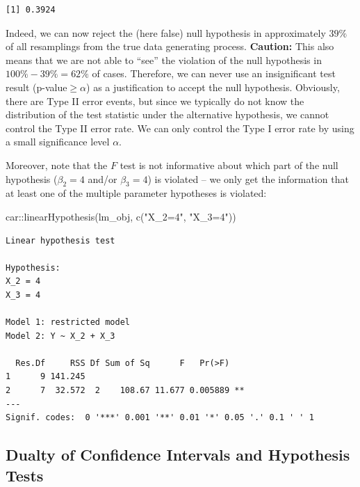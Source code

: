 \documentclass[
  letterpaper,
  DIV=11,
  numbers=noendperiod]{scrreprt}
\newenvironment{Shaded}{\begin{snugshade}}{\end{snugshade}}
\newcommand{\FunctionTok}[1]{\textcolor[rgb]{0.28,0.35,0.67}{#1}}
\newcommand{\NormalTok}[1]{\textcolor[rgb]{0.00,0.23,0.31}{#1}}
\newcommand{\SpecialCharTok}[1]{\textcolor[rgb]{0.37,0.37,0.37}{#1}}
\newcommand{\StringTok}[1]{\textcolor[rgb]{0.13,0.47,0.30}{#1}}
\theoremstyle{definition}
\theoremstyle{plain}
\theoremstyle{plain}
\theoremstyle{remark}
\begin{document}
\begin{verbatim}
[1] 0.3924
\end{verbatim}

Indeed, we can now reject the (here false) null hypothesis in
approximately \(39\%\) of all resamplings from the true data generating
process. \textbf{Caution:} This also means that we are not able to
``see'' the violation of the null hypothesis in \(100\%-39\%=62\%\) of
cases. Therefore, we can never use an insignificant test result
(p-value\(\geq\alpha\)) as a justification to accept the null
hypothesis. Obviously, there are Type II error events, but since we
typically do not know the distribution of the test statistic under the
alternative hypothesis, we cannot control the Type II error rate. We can
only control the Type I error rate by using a small significance level
\(\alpha\).

Moreover, note that the \(F\) test is not informative about which part
of the null hypothesis (\(\beta_2=4\) and/or \(\beta_3=4\)) is violated
-- we only get the information that at least one of the multiple
parameter hypotheses is violated:

\begin{Shaded}
\begin{Highlighting}[]
\NormalTok{car}\SpecialCharTok{::}\FunctionTok{linearHypothesis}\NormalTok{(lm\_obj, }\FunctionTok{c}\NormalTok{(}\StringTok{"X\_2=4"}\NormalTok{, }\StringTok{"X\_3=4"}\NormalTok{))}
\end{Highlighting}
\end{Shaded}

\begin{verbatim}
Linear hypothesis test

Hypothesis:
X_2 = 4
X_3 = 4

Model 1: restricted model
Model 2: Y ~ X_2 + X_3

  Res.Df     RSS Df Sum of Sq      F   Pr(>F)   
1      9 141.245                                
2      7  32.572  2    108.67 11.677 0.005889 **
---
Signif. codes:  0 '***' 0.001 '**' 0.01 '*' 0.05 '.' 0.1 ' ' 1
\end{verbatim}

\hypertarget{dualty-of-confidence-intervals-and-hypothesis-tests}{%
\subsection{Dualty of Confidence Intervals and Hypothesis
Tests}\label{dualty-of-confidence-intervals-and-hypothesis-tests}}
\end{document}
